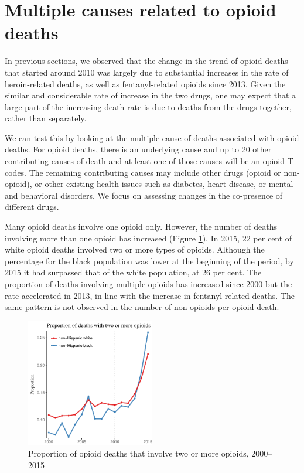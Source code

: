 \documentclass[12pt, a4paper]{article}
\begin{document}
\section{Multiple causes related to opioid deaths} \label{section:multiple_cause}
In previous sections, we observed that the change in the trend of opioid deaths that started around 2010 was largely due to substantial increases in the rate of heroin-related deaths, as well as fentanyl-related opioids since 2013. Given the similar and considerable rate of increase in the two drugs, one may expect that a large part of the increasing death rate is due to deaths from the drugs together, rather than separately. 

We can test this by looking at the multiple cause-of-deaths associated with opioid deaths. For opioid deaths, there is an underlying cause and up to 20 other contributing causes of death and at least one of those causes will be an opioid T-codes. The remaining contributing causes may include other drugs (opioid or non-opioid), or other existing health issues such as diabetes, heart disease, or mental and behavioral disorders. We focus on assessing changes in the co-presence of different drugs. 

Many opioid deaths involve one opioid only. However, the number of deaths involving more than one opioid has increased (Figure \ref{fig:twomore}). In 2015, 22 per cent of white opioid deaths involved two or more types of opioids. Although the percentage for the black population was lower at the beginning of the period, by 2015 it had surpassed that of the white population, at 26 per cent. The proportion of deaths involving multiple opioids has increased since 2000 but the rate accelerated in 2013, in line with the increase in fentanyl-related deaths. The same pattern is not observed in the number of non-opioids per opioid death. 

\begin{figure}[h!]
 \centering
\includegraphics[width=0.5\textwidth]{./plots/paper_fig8_prop_2_more_v.pdf} 
 \caption{Proportion of opioid deaths that involve two or more opioids, 2000--2015}
 \label{fig:twomore}
\end{figure}
\end{document}
